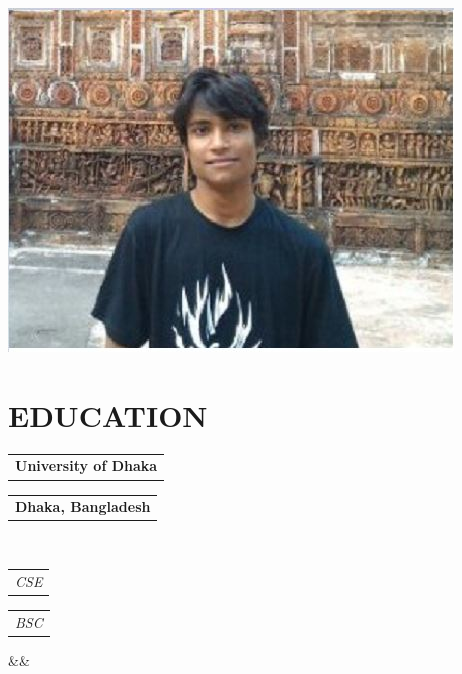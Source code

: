 \documentclass[11pt,a4paper,roman]{moderncv}
\makeatletter
\newcommand*{\customcventry}[7][.25em]{
  \begin{tabular}{@{}l} 
    {\bfseries #4}
  \end{tabular}
  \hfill%
  \begin{tabular}{l@{}}
     {\bfseries #5}
  \end{tabular} \\
  \begin{tabular}{@{}l} 
    {\itshape #3}
  \end{tabular}
  \hfill%
  \begin{tabular}{l@{}}
     {\itshape #2}
  \end{tabular}
  \ifx&#7&%
  \else{\\%
    \begin{minipage}{\maincolumnwidth}%
      \small#7%
    \end{minipage}}\fi%
  \par\addvspace{#1}}
\makeatother
\begin{document}

\makecvtitle
\vspace{-.2in}
\begin{center}
	\includegraphics[scale=.2]{pp1}
\end{center}
\vspace*{-.2in}

\section{EDUCATION}
{\customcventry{BSC}{CSE}{University of Dhaka}{Dhaka, Bangladesh}{}{}}
\end{document}
